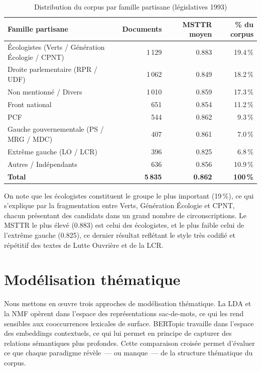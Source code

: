 \documentclass{article}
\begin{document}
\begin{table}[h]
\caption{Distribution du corpus par famille partisane (législatives 1993)}
\label{tab:corpus}
\centering
\small
\begin{tabular}{lrrr}
\toprule
Famille partisane & Documents & MSTTR moyen & \% du corpus \\
\midrule
Écologistes (Verts / Génération Écologie / CPNT) & 1\,129 & 0.883 & 19.4\,\% \\
Droite parlementaire (RPR / UDF)                 & 1\,062 & 0.849 & 18.2\,\% \\
Non mentionné / Divers                           & 1\,010 & 0.859 & 17.3\,\% \\
Front national                                   &   651  & 0.854 & 11.2\,\% \\
PCF                                              &   544  & 0.862 &  9.3\,\% \\
Gauche gouvernementale (PS / MRG / MDC)          &   407  & 0.861 &  7.0\,\% \\
Extrême gauche (LO / LCR)                        &   396  & 0.825 &  6.8\,\% \\
Autres / Indépendants                            &   636  & 0.856 & 10.9\,\% \\
\midrule
\textbf{Total}                                   & \textbf{5\,835} & \textbf{0.862} & \textbf{100\,\%} \\
\bottomrule
\end{tabular}
\end{table}

On note que les écologistes constituent le groupe le plus important (19\,\%),
ce qui s'explique par la fragmentation entre Verts, Génération Écologie et
CPNT, chacun présentant des candidats dans un grand nombre de circonscriptions.
Le MSTTR le plus élevé (0.883) est celui des écologistes, et le plus faible
celui de l'extrême gauche (0.825), ce dernier résultat reflétant le style
très codifié et répétitif des textes de Lutte Ouvrière et de la LCR.

\section{Modélisation thématique}
\label{sec:topics}

Nous mettons en œuvre trois approches de modélisation thématique.
La LDA et la NMF opèrent dans l'espace des représentations sac-de-mots,
ce qui les rend sensibles aux cooccurrences lexicales de surface.
BERTopic travaille dans l'espace des embeddings contextuels, ce qui lui permet
en principe de capturer des relations sémantiques plus profondes.
Cette comparaison croisée permet d'évaluer ce que chaque paradigme révèle~---
ou manque~--- de la structure thématique du corpus.
\end{document}
